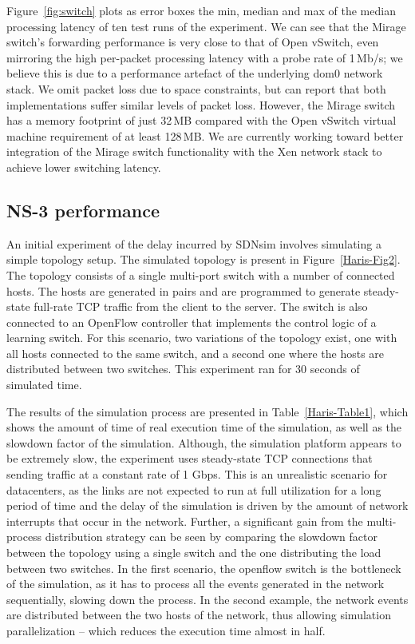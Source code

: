 Figure~\ref{fig:switch} plots as error boxes the min, median and max of the
median processing latency of ten test runs of the experiment. We can see that
the Mirage switch's forwarding performance is very close to that of Open
vSwitch, even mirroring the high per-packet processing latency with a probe
rate of 1\,Mb/s; we believe this is due to a performance artefact of the
underlying dom0 network stack. We omit packet loss due to space constraints,
but can report that both implementations suffer similar levels of packet loss.
However, the Mirage switch has a memory footprint of just 32\,MB compared with
the Open vSwitch virtual machine requirement of at least 128\,MB. We are
currently working toward better integration of the Mirage switch functionality
with the Xen network stack to achieve lower switching latency.

\subsection{NS-3 performance} \label{sec:sdnsim-ns3-perf}

An initial experiment of the delay incurred by SDNsim involves
simulating a simple topology setup.  The simulated topology is present
in Figure~\ref{Haris-Fig2}.  The topology consists of a single
multi-port switch with a number of connected hosts.  The hosts are
generated in pairs and are programmed to generate steady-state
full-rate TCP traffic from the client to the server. The switch is
also connected to an OpenFlow controller that implements the control
logic of a learning switch.  For this scenario, two variations of the
topology exist, one with all hosts connected to the same switch, and a
second one where the hosts are distributed between two switches. This
experiment ran for 30 seconds of simulated time.

The results of the simulation process are presented in
Table~\ref{Haris-Table1}, which shows the amount of time of real
execution time of the simulation, as well as the slowdown factor of
the simulation. Although, the simulation platform appears to be
extremely slow, the experiment uses steady-state TCP connections that
sending traffic at a constant rate of 1 Gbps. This is an unrealistic
scenario for datacenters, as the links are not expected to run at full
utilization for a long period of time and the delay of the simulation
is driven by the amount of network interrupts that occur in the
network. Further, a significant gain from the multi-process
distribution strategy can be seen by comparing the slowdown factor
between the topology using a single switch and the one distributing
the load between two switches. In the first scenario, the openflow
switch is the bottleneck of the simulation, as it has to process all
the events generated in the network sequentially, slowing down the
process. In the second example, the network events are distributed
between the two hosts of the network, thus allowing simulation
parallelization -- which reduces the execution time almost in half.


